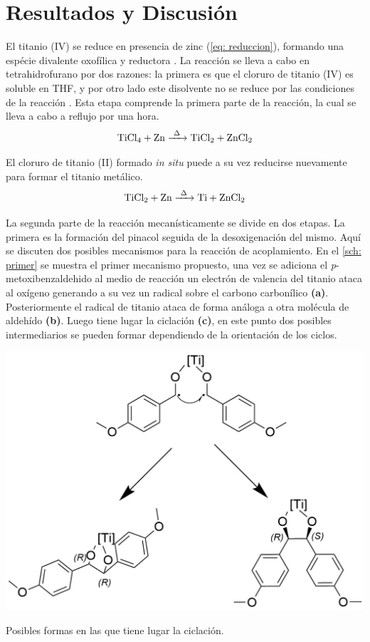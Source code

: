 \documentclass[fleqn,11pt]{SelfArx}
\begin{document}
\newpage

\section{Resultados y Discusi\'on}
El titanio (IV) se reduce en presencia de zinc (\autoref{eq: reduccion}), formando una esp\'ecie divalente oxof\'ilica y reductora \cite{richards2001}. La reacci\'on se lleva a cabo en tetrahidrofurano por dos razones: la primera es que el cloruro de titanio (IV) es soluble en THF, y por otro lado este disolvente no se reduce por las condiciones de la reacci\'on \cite{richards2001}. Esta etapa comprende la primera parte de la reacci\'on, la cual se lleva a cabo a reflujo por una hora.
\begin{equation}\label{eq: reduccion}
	\ce{TiCl4 + Zn ->[\Delta] TiCl2 + ZnCl2}
\end{equation}

El cloruro de titanio (II) formado \textit{in situ} puede a su vez reducirse nuevamente para formar el titanio met\'alico.
\begin{equation}
	\ce{TiCl2 + Zn ->[\Delta] Ti + ZnCl2}
\end{equation}

La segunda parte de la reacci\'on mecan\'isticamente se divide en dos etapas. La primera es la formaci\'on del pinacol seguida de la desoxigenaci\'on del mismo. Aquí se discuten dos posibles mecanismos para la reacci\'on de acoplamiento. En el \autoref{sch: primer} se muestra el primer mecanismo propuesto, una vez se adiciona el \textit{p}-metoxibenzaldehido al medio de reacci\'on un electr\'on de valencia del titanio ataca al ox\'igeno generando a su vez un radical sobre el carbono carbon\'ilico \textbf{(a)}. Posteriormente el radical de titanio ataca de forma an\'aloga a otra mol\'ecula de aldeh\'ido \textbf{(b)}. Luego tiene lugar la ciclaci\'on \textbf{(c)}, en este punto dos posibles intermediarios se pueden formar dependiendo de la orientaci\'on de los ciclos.
\begin{scheme}[h]
	\centering
	\includegraphics[width = 0.8\linewidth]{structures/EZdetermined.png}
	\caption{Posibles formas en las que tiene lugar la ciclaci\'on.}
	\label{sch: EZ}
\end{scheme}
\end{document}
